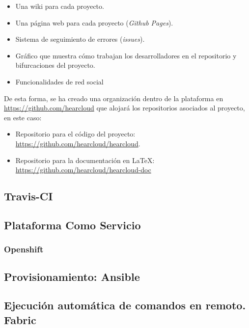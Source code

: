 \begin{itemize}
	\item Una wiki para cada proyecto.
	\item Una página web para cada proyecto (\textit{Github Pages}).
	\item Sistema de seguimiento de errores (\textit{issues}).
	\item Gráfico que muestra cómo trabajan los desarrolladores en el repositorio y bifurcaciones del proyecto.
	\item Funcionalidades de red social
\end{itemize}

De esta forma, se ha creado una organización dentro de la plataforma en \url{https://github.com/hearcloud} que alojará los repositorios asociados al proyecto, en este caso:

\begin{itemize}
	\item Repositorio para el código del proyecto: \url{https://github.com/hearcloud/hearcloud}.
	\item Repositorio para la documentación en {\LaTeX\xspace}: \url{https://github.com/hearcloud/hearcloud-doc}
\end{itemize}

\subsection{Travis-CI}

\subsection{Plataforma Como Servicio}

\subsubsection{Openshift}

\subsection{Provisionamiento: Ansible}

\subsection{Ejecución automática de comandos en remoto. Fabric}

